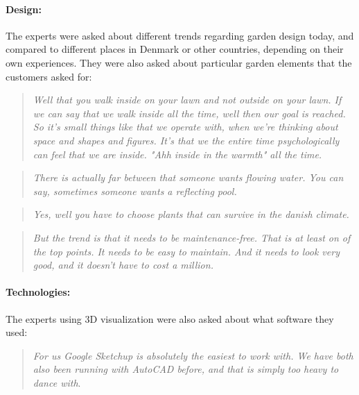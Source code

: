 		\paragraph*{Design:}
		The experts were asked about different trends regarding garden design today, and compared to different places in Denmark or other countries, depending on their own experiences. They were also asked about particular garden elements that the customers asked for:\\
		\begin{quote}
			\textit{Well that you walk inside on your lawn and not outside on your lawn. If we can say that we walk inside all the time, well then our goal is reached. So it's small things like that we operate with, when we're thinking about space and shapes and figures. It's that we the entire time psychologically can feel that we are inside. "Ahh inside in the warmth" all the time.}\label{quote:expertDesign1}
		\end{quote}
		
		\begin{quote}
			\textit{There is actually far between that someone wants flowing water. You can say, sometimes someone wants a reflecting pool.}\label{quote:expertDesign2}\\
		\end{quote}
	
		\begin{quote}
			\textit{Yes, well you have to choose plants that can survive in the danish climate.}\label{quote:expertDesign3}\\
		\end{quote}
		
		\begin{quote}
			\textit{But the trend is that it needs to be maintenance-free. That is at least on of the top points. It needs to be easy to maintain. And it needs to look very good, and it doesn't have to cost a million.}\label{quote:expertDesign4}\\
		\end{quote}
		
		\paragraph*{Technologies:}
		The experts using 3D visualization were also asked about what software they used:\\
		
		\begin{quote}
			\textit{For us Google Sketchup is absolutely the easiest to work with. We have both also been running with AutoCAD before, and that is simply too heavy to dance with}\label{quote:expertTech1}.\\
		\end{quote}
	
